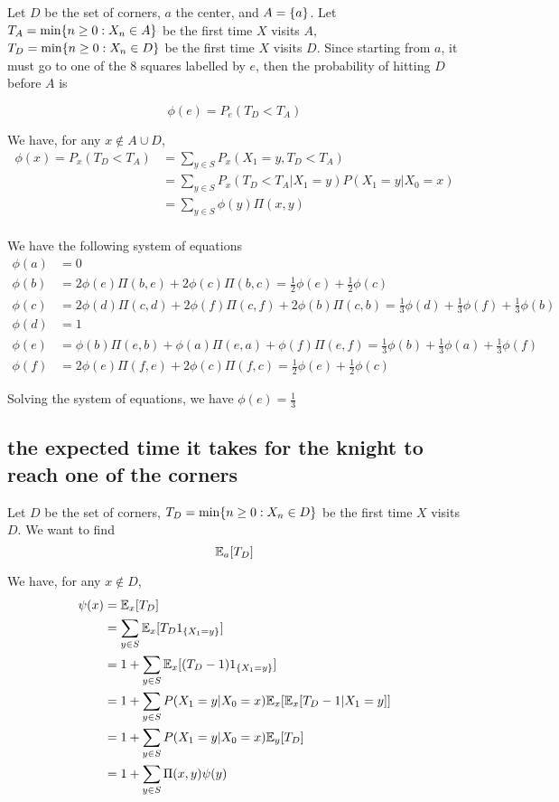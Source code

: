 \documentclass{article}
\begin{document}
Let $D$ be the set of corners, $a$ the center, and $A = \{a\}$. Let $T_A = \min\{n \geq 0: X_n \in A\}$ be the first time $X$ visits $A$, $T_D = \min\{n \geq 0: X_n \in D\}$ be the first time $X$ visits $D$. Since starting from $a$, it must go to one of the 8 squares labelled by $e$, then the probability of hitting $D$ before $A$ is

$$
    \phi(e) = P_e(T_D < T_A)
$$


We have, for any $x \notin A \cup D$,
\begin{align*}
    \phi(x) = P_x(T_D < T_A)
    &= \sum_{y \in S} P_x(X_1 = y, T_D < T_A) \\
    &= \sum_{y \in S} P_x(T_D < T_A| X_1 = y) P(X_1 = y | X_0 = x) \\
    &= \sum_{y \in S} \phi(y) \Pi(x, y) \\
\end{align*}

We have the following system of equations
\begin{align*}
    \phi(a) &= 0 \\
    \phi(b) &= 2 \phi(e) \Pi(b, e) + 2 \phi(c) \Pi(b, c) = \frac{1}{2}\phi(e) + \frac{1}{2}\phi(c) \\
    \phi(c) &= 2 \phi(d) \Pi(c, d) + 2 \phi(f) \Pi(c, f) + 2 \phi(b) \Pi(c, b) = \frac{1}{3}\phi(d) + \frac{1}{3}\phi(f) + \frac{1}{3}\phi(b) \\
    \phi(d) &= 1 \\
    \phi(e) &= \phi(b) \Pi(e, b) + \phi(a) \Pi(e, a) + \phi(f) \Pi(e, f) = \frac{1}{3}\phi(b) + \frac{1}{3}\phi(a) + \frac{1}{3}\phi(f) \\
    \phi(f) &= 2 \phi(e) \Pi(f,e) + 2 \phi(c) \Pi(f, c) = \frac{1}{2}\phi(e) + \frac{1}{2}\phi(c)
\end{align*}

Solving the system of equations, we have $\phi(e) = \frac{1}{3}$

\subsection{the expected time it takes for the knight to reach one of the corners}

Let $D$ be the set of corners, $T_D = \min\{n \geq 0: X_n \in D\}$ be the first time $X$ visits $D$. We want to find
$$
    \mathbb{E}_a[T_D]
$$

We have, for any $x \notin D$,
\begin{align*}
    \psi(x)
    &= \mathbb{E}_x[T_D] \\
    &= \sum_{y \in S} \mathbb{E}_x[T_D 1_{\{X_1 = y\}}] \\
    &= 1 + \sum_{y \in S} \mathbb{E}_x[(T_D - 1) 1_{\{X_1 = y\}}] \\
    &= 1 + \sum_{y \in S} P(X_1 = y | X_0 = x) \mathbb{E}_x[\mathbb{E}_x[T_D - 1 | X_1 = y]] \\
    &= 1 + \sum_{y \in S} P(X_1 = y | X_0 = x) \mathbb{E}_y[T_D] \\ 
    &= 1 + \sum_{y \in S} \Pi(x, y) \psi(y) \\ 
\end{align*}
\end{document}
